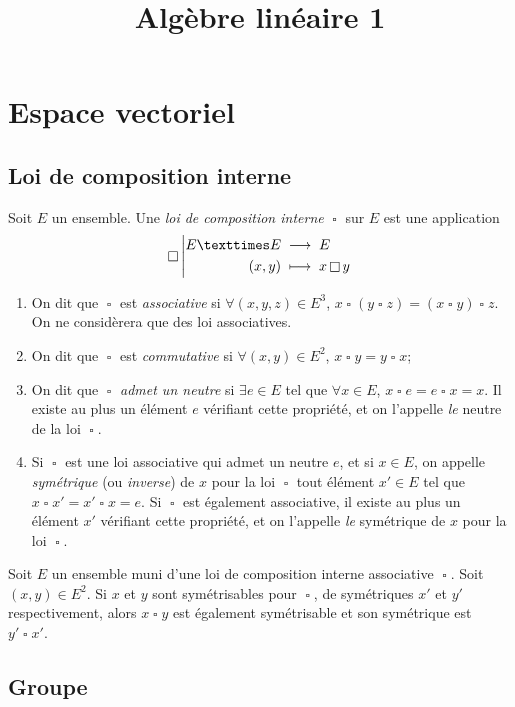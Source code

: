 \documentclass{yann}
\newcommand{\myop}{\mathop{\square}}
\begin{document}
\title{Algèbre linéaire 1}
\maketitle

\section{Espace vectoriel}

\subsection{Loi de composition interne}


Soit $E$ un ensemble. Une \emph{loi de composition interne} $\myop$ sur $E$ est une application
$$ \Fonction{\myop}{E×E}{E}{(x,y)}{x \myop y} $$
\begin{enumerate}
\item
  On dit que $\myop$ est \emph{associative} si $∀(x,y,z)∈E^3$, $x \myop (y \myop z) = (x \myop y) \myop z$.
  On ne considèrera que des loi associatives.
\item
  On dit que $\myop$ est \emph{commutative} si $∀(x,y)∈E^2$, $x \myop y = y \myop x$;
\item
  On dit que $\myop$ \emph{admet un neutre} si $∃e∈E$ tel que $∀x∈E$, $x \myop e = e \myop x = x$.
  Il existe au plus un élément $e$ vérifiant cette propriété, et on l'appelle \emph{le} neutre de la loi $\myop$.
\item
  Si $\myop$ est une loi associative qui admet un neutre $e$, et si $x∈E$, on appelle \emph{symétrique} (ou \emph{inverse}) de $x$ pour la loi $\myop$ tout élément $x'∈E$ tel que $x \myop x' = x' \myop x = e$.
  Si $\myop$ est également associative, il existe au plus un élément $x'$ vérifiant cette propriété, et on l'appelle \emph{le} symétrique de $x$ pour la loi $\myop$.
\end{enumerate}


Soit $E$ un ensemble muni d'une loi de composition interne associative $\myop$.
Soit $(x,y)∈E^2$.
Si $x$ et $y$ sont symétrisables pour $\myop$, de symétriques $x'$ et $y'$ respectivement,
alors $x \myop y$ est également symétrisable et son symétrique est $y' \myop x'$.

\subsection{Groupe}
\end{document}
